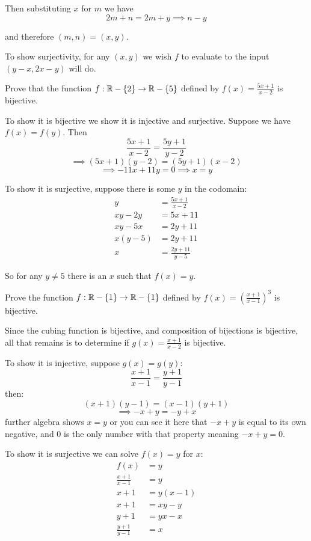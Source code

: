 \documentclass{article}
\begin{document}
Then substituting $x$ for $m$ we have
$$2m + n = 2m + y \implies n - y$$

and therefore $(m, n) = (x, y)$.

To show surjectivity, for any $(x, y)$ we wish $f$ to evaluate to the input $(y - x, 2x - y)$ will do.

\begin{problem}
Prove that the function $f: \mathbb{R} - \{2\} \to \mathbb{R} - \{5\}$ defined by $f(x) = \frac{5x + 1}{x-2}$ is bijective.
\end{problem}

To show it is bijective we show it is injective and surjective. Suppose we have $f(x) = f(y)$. Then
$$\frac{5x+1}{x-2} = \frac{5y+1}{y-2}$$
$$\implies (5x+1)(y-2) = (5y+1)(x-2)$$
$$\implies -11x + 11y = 0 \implies x = y$$

To show it is surjective, suppose there is some $y$ in the codomain:
\begin{align*}
  y        & = \frac{5x + 1}{x-2}    \\
  xy - 2y  & = 5x + 11               \\
  xy - 5x  & = 2y + 11               \\
  x(y - 5) & = 2y + 11               \\
  x        & = \frac{2y + 11}{y - 5}
\end{align*}

So for any $y \neq 5$ there is an $x$ such that $f(x) = y$.

\begin{problem}
Prove the function $f: \mathbb{R} - \{1\} \to \mathbb{R} - \{1\}$ defined by $f(x) = \left(\frac{x+1}{x-1}\right)^3$ is bijective.
\end{problem}

Since the cubing function is bijective, and composition of bijections is bijective, all that remains is to determine if $g(x) = \frac{x + 1}{x - 2}$ is bijective.

To show it is injective, suppose $g(x) = g(y)$:
$$\frac{x+1}{x-1} = \frac{y + 1}{y - 1}$$
then:
$$(x + 1)(y - 1) = (x - 1) (y + 1)$$
$$\implies -x + y = -y + x$$
further algebra shows $x = y$ or you can see it here that $-x + y$ is equal to its own negative, and 0 is the only number with that property meaning $-x + y = 0$.

To show it is surjective we can solve $f(x) = y$ for $x$:
\begin{align*}
  f(x)                & = y        \\
  \frac{x + 1}{x - 1} & = y        \\
  x + 1               & = y(x - 1) \\
  x + 1               & = xy - y   \\
  y + 1               & = yx - x   \\
  \frac{y + 1}{y - 1} & = x
\end{align*}
\end{document}

